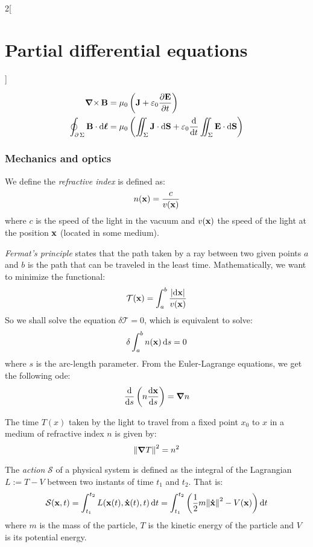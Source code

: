 \documentclass[../../../main_math.tex]{subfiles}
\begin{document}
\begin{multicols}{2}[\section{Partial differential equations}]
\begin{proposition}
    \begin{align*}
      \operatorname{\boldsymbol{\mathrm{\nabla}}\times}\boldsymbol{\mathrm{B}}                                   & =\mu_0\left(\boldsymbol{\mathrm{J}}+\varepsilon_0\pdv{\boldsymbol{\mathrm{E}}}{t}\right)                                                          \\
      \oint_{\operatorname{\partial}{\Sigma}}\boldsymbol{\mathrm{B}}\cdot \dd{\boldsymbol{\mathrm{\ell}}} & =\mu_0 \left(\iint_\Sigma\boldsymbol{\mathrm{J}}\cdot\dd{\boldsymbol{\mathrm{S}}}+\varepsilon_0\dv{}{t}\iint_\Sigma\boldsymbol{\mathrm{E}}\cdot \dd{\boldsymbol{\mathrm{S}}}\right)
    \end{align*}
  \end{proposition}
  \subsubsection{Mechanics and optics}
  \begin{definition}
    We define the \emph{refractive index} is defined as: $$n(\boldsymbol{\mathrm{x}})=\frac{c}{v(\boldsymbol{\mathrm{x}})}$$ where $c$ is the speed of the light in the vacuum and $v(\boldsymbol{\mathrm{x}})$ the speed of the light at the position $\boldsymbol{\mathrm{x}}$ (located in some medium).
  \end{definition}
  \begin{proposition}
    \emph{Fermat's principle} states that the path taken by a ray between two given points $a$ and $b$ is the path that can be traveled in the least time. Mathematically, we want to minimize the functional: $$\mathcal{T}(\boldsymbol{\mathrm{x}})=\int_a^b\frac{\abs{\dd{\boldsymbol{\mathrm{x}}}}}{v(\boldsymbol{\mathrm{x}})}$$
    So we shall solve the equation $\delta \mathcal{T}=0$, which is equivalent to solve: $$\delta\int_a^bn(\boldsymbol{\mathrm{x}})\dd{s}=0$$ where $s$ is the arc-length parameter. From the Euler-Lagrange equations, we get the following ode: $$\dv{}{s}\left(n\dv{\boldsymbol{\mathrm{x}}}{s}\right)=\grad{n}$$
  \end{proposition}
  \begin{proposition}
    The time $T(x)$ taken by the light to travel from a fixed point $x_0$ to $x$ in a medium of refractive index $n$ is given by: $${\left\|\grad{T}\right\|}^2=n^2$$
  \end{proposition}
  \begin{definition}
    The \emph{action} $\mathcal{S}$ of a physical system is defined as the integral of the Lagrangian $L:=T-V$ between two instants of time $t_1$ and $t_2$. That is: $$\mathcal{S}(\boldsymbol{\mathrm{x}},t)=\int_{t_1}^{t_2}L(\boldsymbol{\mathrm{x}}(t),\boldsymbol{\mathrm{\dot{x}}}(t),t)\dd{t}=\int_{t_1}^{t_2}\left(\frac{1}{2}m{\left\|\boldsymbol{\mathrm{\dot{x}}}\right\|}^2-V(\boldsymbol{\mathrm{x}})\right)\dd{t}$$
    where $m$ is the mass of the particle, $T$ is the kinetic energy of the particle and $V$ is its potential energy.
  \end{definition}

\end{multicols}
\end{document}

